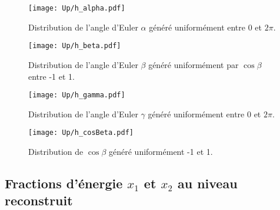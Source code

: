 \documentclass[a4paper]{article} %
\numberwithin{equation}{section} %
\theoremstyle{definition}
\theoremstyle{remark}
\theoremstyle{plain}%
\theoremstyle{style_exemple}
\begin{document}
\begin{figure}[H]
    \centering
    \texttt{[image: Up/h\_alpha.pdf]}
    \begin{minipage}{12cm}
        \caption{Distribution de l'angle d'Euler $\alpha$ généré uniformément entre 0 et $2\pi$.}
        \label{fig:alpha}
    \end{minipage}
\end{figure}

\begin{figure}[H]
    \centering
    \texttt{[image: Up/h\_beta.pdf]}
    \begin{minipage}{12cm}
        \caption{Distribution de l'angle d'Euler $\beta$ généré uniformément par $\cos\beta$ entre -1 et 1.}
        \label{fig:beta}
    \end{minipage}
\end{figure}

\begin{figure}[H]
    \centering
    \texttt{[image: Up/h\_gamma.pdf]}
    \begin{minipage}{12cm}
        \caption{Distribution de l'angle d'Euler $\gamma$ généré uniformément entre 0 et $2\pi$.}
        \label{fig:gamma}
    \end{minipage}
\end{figure}

\begin{figure}[H]
    \centering
    \texttt{[image: Up/h\_cosBeta.pdf]}
    \begin{minipage}{12cm}
        \caption{Distribution de $\cos\beta$ généré uniformément -1 et 1.}
        \label{fig:cosbeta}
    \end{minipage}
\end{figure}

\subsection{Fractions d'énergie $x_1$ et $x_2$ au niveau reconstruit}\label{sec:x1x2_rec}
\end{document}
